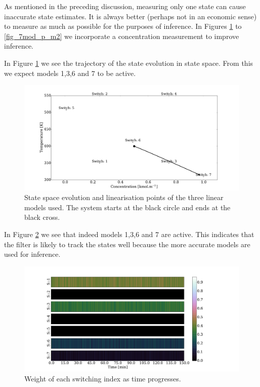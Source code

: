 \documentclass[../masters.tex]{subfiles}
\begin{document}
As mentioned in the preceding discussion, measuring only one state can cause inaccurate state estimates. It is always better (perhaps not in an economic sense) to measure as much as possible for the purposes of inference. In Figures \ref{fig_7mod_ss_m2} to \ref{fig_7mod_p_m2} we incorporate a concentration measurement to improve inference. 

In Figure \ref{fig_7mod_ss_m2} we see the trajectory of the state evolution in state space. From this we expect models 1,3,6 and 7 to be active. 
\begin{figure}[H] 
\centering
\includegraphics[scale=0.3]{skf_s7_s_m2.pdf}
\caption{State space evolution and linearisation points of the three linear models used. The system starts at the black circle and ends at the black cross.}
\label{fig_7mod_ss_m2}
\end{figure}
In Figure \ref{fig_7mod_w_m2} we see that indeed models 1,3,6 and 7 are active. This indicates that the filter is likely to track the states well because the more accurate models are used for inference.
\begin{figure}[H] 
\centering
\includegraphics[scale=0.3]{skf_s7_w_m2.pdf}
\caption{Weight of each switching index as time progresses.}
\label{fig_7mod_w_m2}
\end{figure}
\end{document}
